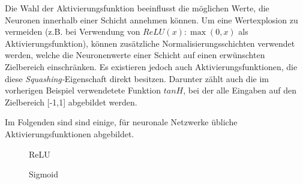 Die Wahl der Aktivierungsfunktion beeinflusst die möglichen
Werte, die Neuronen innerhalb einer Schicht annehmen können. Um eine
Wertexplosion zu vermeiden (z.B. bei Verwendung von $ReLU(x): \max(0,x)$ als
Aktivierungsfunktion), können zusätzliche Normalisierungsschichten verwendet
werden, welche die Neuronenwerte einer Schicht auf einen erwünschten Zielbereich
einschränken. Es existieren jedoch auch Aktivierungsfunktionen, die diese
\emph{Squashing-}Eigenschaft direkt besitzen. Darunter zählt auch die im
vorherigen Beispiel verwendetete Funktion $tanH$, bei der alle Eingaben auf den
Zielbereich [-1,1] abgebildet werden.

Im Folgenden sind sind einige, für neuronale Netzwerke übliche
Aktivierungsfunktionen abgebildet.

\begin{figure}[H]
    \begin{minipage}{0.45\textwidth}
        \begin{center}
        \end{center}
        \caption{ReLU}
    \end{minipage}\hfill
    \begin{minipage}{0.45\textwidth}
        \begin{center}
        \end{center}
        \caption{Sigmoid}
    \end{minipage}
\end{figure}
%
